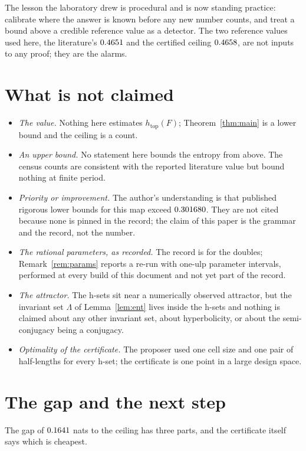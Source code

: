 \documentclass[11pt]{article}
\newcommand{\htop}{h_{\mathrm{top}}}
\begin{document}
The lesson the laboratory drew is procedural and is now standing practice: calibrate where the answer is known
before any new number counts, and treat a bound above a credible reference value as a detector. The two reference
values used here, the literature's $0.4651$ and the certified ceiling $0.4658$, are not inputs to any proof; they
are the alarms.

\section{What is not claimed}

\begin{itemize}
\item \emph{The value.} Nothing here estimates $\htop(F)$; Theorem~\ref{thm:main} is a lower bound and the ceiling is a
count.
\item \emph{An upper bound.} No statement here bounds the entropy from above. The census counts are consistent
with the reported literature value but bound nothing at finite period.
\item \emph{Priority or improvement.} The author's understanding is that published rigorous lower bounds for this map
exceed $0.301680$. They are not cited because none is pinned in the record; the claim of this paper is the grammar and
the record, not the number.
\item \emph{The rational parameters, as recorded.} The record is for the doubles; Remark~\ref{rem:params} reports a
re-run with one-ulp parameter intervals, performed at every build of this document and not yet part of the record.
\item \emph{The attractor.} The h-sets sit near a numerically observed attractor, but the invariant set $\Lambda$ of
Lemma~\ref{lem:ent} lives inside the h-sets and nothing is claimed about any other invariant set, about hyperbolicity,
or about the semi-conjugacy being a conjugacy.
\item \emph{Optimality of the certificate.} The proposer used one cell size and one pair of half-lengths for every
h-set; the certificate is one point in a large design space.
\end{itemize}

\section{The gap and the next step}\label{sec:open}

The gap of $0.1641$ nats to the ceiling has three parts, and the certificate itself says which is cheapest.
\end{document}

